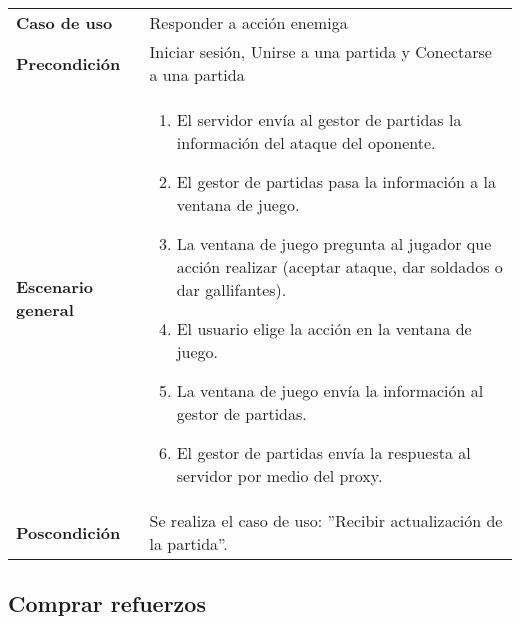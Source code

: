 {\footnotesize
\begin{tabularx}{0.95\textwidth}{p{}|X}

\textbf{Caso de uso} & Responder a acción enemiga \\

\textbf{Precondición} & Iniciar sesión, Unirse a una partida y Conectarse a una
partida \\

\textbf{Escenario general} & \begin{enumerate}
\item El servidor envía al gestor de partidas la información del ataque del
oponente.
\item El gestor de partidas pasa la información a la ventana de juego.
\item La ventana de juego pregunta al jugador que acción realizar (aceptar
ataque, dar soldados o dar gallifantes).
\item El usuario elige la acción en la ventana de juego.
\item La ventana de juego envía la información al gestor de partidas.
\item El gestor de partidas envía la respuesta al servidor por medio del proxy.

\end{enumerate} \\

\textbf{Poscondición} & Se realiza el caso de uso: ''Recibir actualización de la
partida''.

\end{tabularx}
}

\subsection{Comprar refuerzos}

